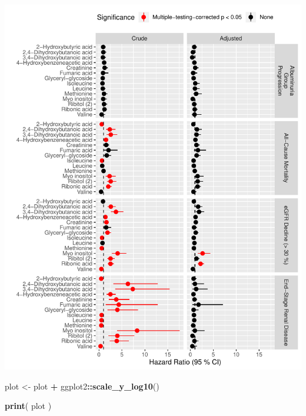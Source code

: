 \documentclass[]{article}
\newenvironment{Shaded}{\begin{snugshade}}{\end{snugshade}}
\newcommand{\KeywordTok}[1]{\textcolor[rgb]{0.13,0.29,0.53}{\textbf{#1}}}
\newcommand{\NormalTok}[1]{#1}
\newcommand{\OperatorTok}[1]{\textcolor[rgb]{0.81,0.36,0.00}{\textbf{#1}}}
\newcommand{\StringTok}[1]{\textcolor[rgb]{0.31,0.60,0.02}{#1}}
\begin{document}
\includegraphics{0033_PROFIL--Metabolomics_files/figure-latex/Surv-Compilation-Combined-From-All-Forest-1.pdf}

\begin{Shaded}
\begin{Highlighting}[]
\NormalTok{plot <-}\StringTok{ }\NormalTok{plot }\OperatorTok{+}\StringTok{ }\NormalTok{ggplot2}\OperatorTok{::}\KeywordTok{scale_y_log10}\NormalTok{()}

\KeywordTok{print}\NormalTok{( plot )}
\end{Highlighting}
\end{Shaded}
\end{document}

